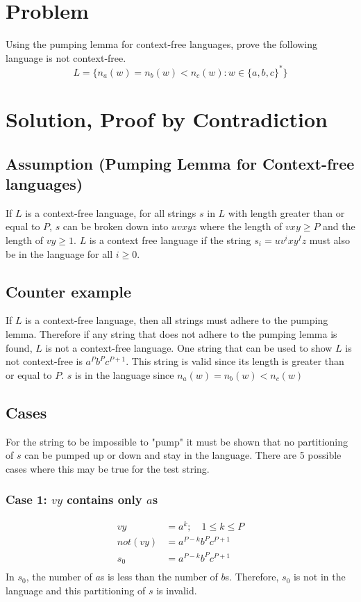 \documentclass{assignment-x}
\begin{document}
\maketitle
\pagebreak

\section{Problem}
Using the pumping lemma for context-free languages, prove the following language is not context-free.
$$L=\{n_a(w) = n_b(w) <n_c(w): w \in \{a,b,c\}^*\}$$

\section{Solution, Proof by Contradiction}

\subsection{Assumption (Pumping Lemma for Context-free languages)}
If $L$ is a context-free language, for all strings $s$ in $L$ with length greater than or equal to $P$, $s$ can be broken down into $uvxyz$ where the length of $vxy \ge P$ and the length of $vy \ge 1$. $L$ is a context free language if the string $s_i = uv^ixy^Iz$ must also be in the language for all $i \ge 0$.

\subsection{Counter example}
If $L$ is a context-free language, then all strings must adhere to the pumping lemma. Therefore if any string that does not adhere to the pumping lemma is found, $L$ is not a context-free language. One string that can be used to show $L$ is not context-free is $a^Pb^Pc^{P+1}$. This string is valid since its length is greater than or equal to $P$. $s$ is in the language since $n_a(w) = n_b(w) <n_c(w)$

\subsection{Cases}
For the string to be impossible to "pump" it must be shown that no partitioning of $s$ can be pumped up or down and stay in the language. There are 5 possible cases where this may be true for the test string.

\subsubsection{Case 1: $vy$ contains only $a$s}
\begin{align*}
    vy      & =a^k;\quad 1 \le k \le P \\
    not(vy) & = a^{P-k}b^Pc^{P+1}      \\
    s_0     & = a^{P-k}b^Pc^{P+1}      \\
\end{align*}
In $s_0$, the number of $a$s is less than the number of $b$s. Therefore, $s_0$ is not in the language and this partitioning of $s$ is invalid.
\end{document}
